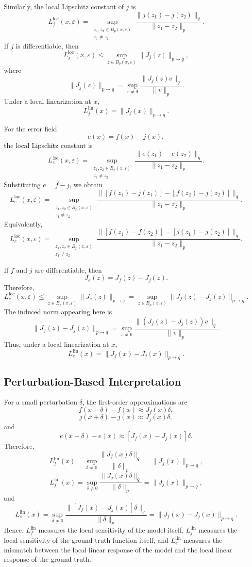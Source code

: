 \documentclass{article}
\begin{document}
Similarly, the local Lipschitz constant of \(j\) is
\[
L_j^{\mathrm{loc}}(x,\varepsilon)
=
\sup_{\substack{z_1,z_2\in B_p(x,\varepsilon)\\ z_1\neq z_2}}
\frac{
\|j(z_1)-j(z_2)\|_q
}{
\|z_1-z_2\|_p
}.
\]
If \(j\) is differentiable, then
\[
L_j^{\mathrm{loc}}(x,\varepsilon)
\le
\sup_{z\in B_p(x,\varepsilon)}
\|J_j(z)\|_{p\to q},
\]
where
\[
\|J_j(z)\|_{p\to q}
=
\sup_{v\neq 0}
\frac{\|J_j(z)v\|_q}{\|v\|_p}.
\]
Under a local linearization at \(x\),
\[
L_j^{\mathrm{lin}}(x)
=
\|J_j(x)\|_{p\to q}.
\]

For the error field
\[
e(x)=f(x)-j(x),
\]
the local Lipschitz constant is
\[
L_e^{\mathrm{loc}}(x,\varepsilon)
=
\sup_{\substack{z_1,z_2\in B_p(x,\varepsilon)\\ z_1\neq z_2}}
\frac{
\|e(z_1)-e(z_2)\|_q
}{
\|z_1-z_2\|_p
}.
\]
Substituting \(e=f-j\), we obtain
\[
L_e^{\mathrm{loc}}(x,\varepsilon)
=
\sup_{\substack{z_1,z_2\in B_p(x,\varepsilon)\\ z_1\neq z_2}}
\frac{
\|[f(z_1)-j(z_1)]-[f(z_2)-j(z_2)]\|_q
}{
\|z_1-z_2\|_p
}.
\]
Equivalently,
\[
L_e^{\mathrm{loc}}(x,\varepsilon)
=
\sup_{\substack{z_1,z_2\in B_p(x,\varepsilon)\\ z_1\neq z_2}}
\frac{
\|[f(z_1)-f(z_2)]-[j(z_1)-j(z_2)]\|_q
}{
\|z_1-z_2\|_p
}.
\]

If \(f\) and \(j\) are differentiable, then
\[
J_e(z)=J_f(z)-J_j(z).
\]
Therefore,
\[
L_e^{\mathrm{loc}}(x,\varepsilon)
\le
\sup_{z\in B_p(x,\varepsilon)}
\|J_e(z)\|_{p\to q}
=
\sup_{z\in B_p(x,\varepsilon)}
\|J_f(z)-J_j(z)\|_{p\to q}.
\]
The induced norm appearing here is
\[
\|J_f(z)-J_j(z)\|_{p\to q}
=
\sup_{v\neq 0}
\frac{
\|(J_f(z)-J_j(z))v\|_q
}{
\|v\|_p
}.
\]
Thus, under a local linearization at \(x\),
\[
L_e^{\mathrm{lin}}(x)
=
\|J_f(x)-J_j(x)\|_{p\to q}.
\]

\subsection{Perturbation-Based Interpretation}

For a small perturbation \(\delta\), the first-order approximations are
\[
f(x+\delta)-f(x)\approx J_f(x)\delta,
\]
\[
j(x+\delta)-j(x)\approx J_j(x)\delta,
\]
and
\[
e(x+\delta)-e(x)
\approx
[J_f(x)-J_j(x)]\delta.
\]
Therefore,
\[
L_f^{\mathrm{lin}}(x)
=
\sup_{\delta\neq 0}
\frac{
\|J_f(x)\delta\|_q
}{
\|\delta\|_p
}
=
\|J_f(x)\|_{p\to q},
\]
\[
L_j^{\mathrm{lin}}(x)
=
\sup_{\delta\neq 0}
\frac{
\|J_j(x)\delta\|_q
}{
\|\delta\|_p
}
=
\|J_j(x)\|_{p\to q},
\]
and
\[
L_e^{\mathrm{lin}}(x)
=
\sup_{\delta\neq 0}
\frac{
\|[J_f(x)-J_j(x)]\delta\|_q
}{
\|\delta\|_p
}
=
\|J_f(x)-J_j(x)\|_{p\to q}.
\]
Hence, \(L_f^{\mathrm{lin}}\) measures the local sensitivity of the model itself, \(L_j^{\mathrm{lin}}\) measures the local sensitivity of the ground-truth function itself, and \(L_e^{\mathrm{lin}}\) measures the mismatch between the local linear response of the model and the local linear response of the ground truth.
\end{document}
